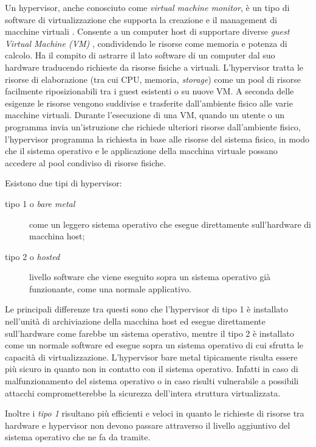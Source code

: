 Un hypervisor, anche conosciuto come \textit{virtual machine monitor}, è un tipo di software di virtualizzazione che supporta la creazione e il management di macchine virtuali \cite{desai2013hypervisor,techtargetHypervisor}. Consente a un computer host di supportare diverse \textit{guest Virtual Machine (VM)}  , condividendo le risorse come memoria e potenza di calcolo.
Ha il compito di astrarre il lato software di un computer dal suo hardware traducendo richieste da risorse fisiche a virtuali.
L'hypervisor tratta le risorse di elaborazione (tra cui CPU, memoria, \textit{storage}) come un pool di risorse facilmente riposizionabili tra i guest esistenti o su nuove VM.
A seconda delle esigenze le risorse vengono suddivise e trasferite dall'ambiente fisico alle varie macchine virtuali. Durante l'esecuzione di una VM, quando un utente o un programma invia un'istruzione che richiede ulteriori risorse dall'ambiente fisico, l'hypervisor programma la richiesta in base alle risorse del sistema fisico, in modo che il sistema operativo e le applicazione della macchina virtuale possano accedere al pool condiviso di risorse fisiche.

Esistono due tipi di hypervisor:
\begin{description}
    \item[tipo 1 o \textit{bare metal}] come un leggero sistema operativo che esegue direttamente sull'hardware di macchina host;
    \item[tipo 2 o \textit{hosted}] livello software  che viene eseguito  sopra un sistema operativo già funzionante, come una normale applicativo.
\end{description}

Le principali differenze tra questi sono che l'hypervisor di tipo 1 è installato nell'unità di archiviazione della macchina host ed esegue direttamente sull'hardware come farebbe un sistema operativo, mentre il tipo 2 è installato come un normale software ed esegue sopra un sistema operativo di cui sfrutta le capacità di virtualizzazione.
L'hypervisor bare metal tipicamente risulta essere più sicuro in quanto non in contatto con il sistema operativo. Infatti in caso di malfunzionamento del sistema operativo o in caso risulti vulnerabile a possibili attacchi comprometterebbe la sicurezza dell'intera struttura virtualizzata.

Inoltre i \textit{tipo 1} risultano più efficienti e veloci in quanto le richieste di risorse tra hardware e hypervisor non devono passare attraverso il livello aggiuntivo del sistema operativo che ne fa da tramite.

